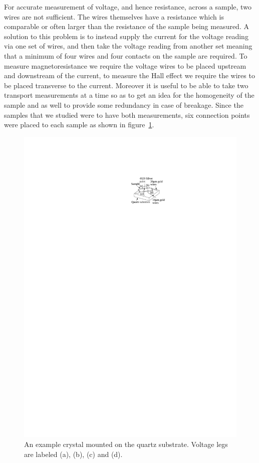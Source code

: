 For accurate measurement of voltage, and hence resistance, across a sample, two wires are not sufficient. The wires themselves have a resistance which is comparable or often larger than the resistance of the sample being measured. A solution to this problem is to instead supply the current for the voltage reading via one set of wires, and then take the voltage reading from another set meaning that a minimum of four wires and four contacts on the sample are required. To measure magnetoresistance we require the voltage wires to be placed upstream and downstream of the current, to measure the Hall effect we require the wires to be placed transverse to the current. Moreover it is useful to be able to take two transport measurements at a time so as to get an idea for the homogeneity of the sample and as well to provide some redundancy in case of breakage. Since the \BSCO samples that we studied were to have both measurements, six connection points were placed to each sample as shown in figure~\ref{Fig:Exp:BSCOSampleSchematic}.
\begin{figure}[htbp]
    \begin{center}
        \includegraphics[scale=0.9]{Chapter-ExperimentalTechnique/Figures/BSCOSampleSchematic/BSCOSampleSchematic}
        \caption{An example \BSCO crystal mounted on the quartz substrate. Voltage legs are labeled (a), (b), (c) and (d).}
        \label{Fig:Exp:BSCOSampleSchematic}
    \end{center}
\end{figure}
